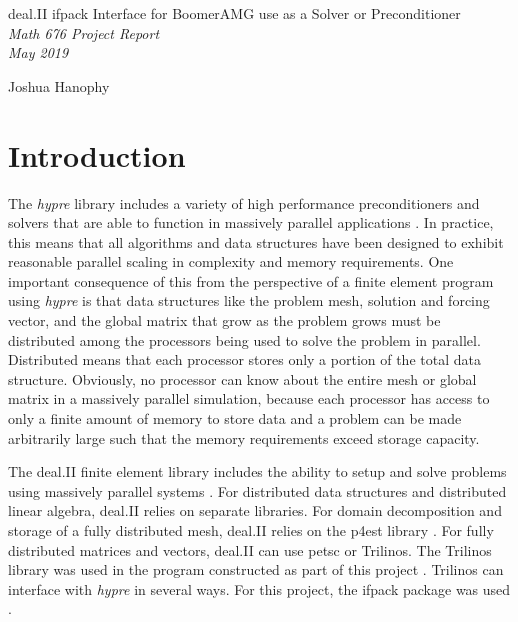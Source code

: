\documentclass[11pt]{article}
\begin{document}
\begin{titlepage}

\vspace*{55mm}
\begin{center}
{\huge deal.II ifpack Interface for BoomerAMG use as a Solver or Preconditioner}\\[1cm]
{\em \huge Math 676 Project Report \\ May 2019}\\[17mm]
\end{center}

\begin{flushright}
{\LARGE Joshua Hanophy}
\end{flushright}

\vfill

 \date{\today}

\end{titlepage}
\newpage
\tableofcontents
\newpage
\section{Introduction}

The \textit{hypre} library includes a variety of high performance preconditioners and solvers that are able to function in massively parallel applications \cite{hypre_description}. In practice, this means that all algorithms and data structures have been designed to exhibit reasonable parallel scaling in complexity and memory requirements. One important consequence of this from the perspective of a finite element program using \textit{hypre} is that data structures like the problem mesh, solution and forcing vector, and the global matrix that grow as the problem grows must be distributed among the processors being used to solve the problem in parallel. Distributed means that each processor stores only a portion of the total data structure. Obviously, no processor can know about the entire mesh or global matrix in a massively parallel simulation, because each processor has access to only a finite amount of memory to store data and a problem can be made arbitrarily large such that the memory requirements exceed storage capacity.

The deal.II finite element library includes the ability to setup and solve problems using massively parallel systems \cite{deal.ii}. For distributed data structures and distributed linear algebra, deal.II relies on separate libraries. For domain decomposition and storage of a fully distributed mesh, deal.II relies on the p4est library \cite{p4est}. For fully distributed matrices and vectors, deal.II can use petsc or Trilinos. The Trilinos library was used in the program constructed as part of this project \cite{Trilinos_general}. Trilinos can interface with \textit{hypre} in several ways. For this project, the ifpack package was used \cite{ifpack-guide}.
\end{document}
